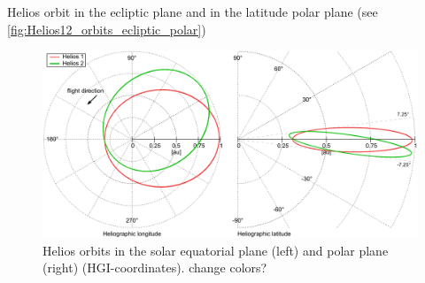 Helios orbit in the ecliptic plane and in the latitude polar plane (see \autoref{fig:Helios12_orbits_ecliptic_polar})\\
\begin{figure}[htb]
	\centering
	\includegraphics[width=\textwidth]{images/gnuplots/Helios12_orbits_ecliptic_polar.pdf}
	\caption{Helios orbits in the solar equatorial plane (left) and polar plane (right) (HGI-coordinates). change colors?}
	\label{fig:Helios12_orbits_ecliptic_polar}
\end{figure}

